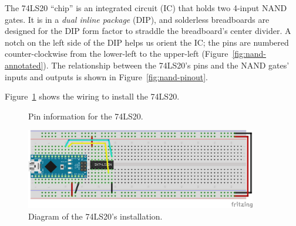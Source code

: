 The 74LS20 ``chip'' is an integrated circuit (IC) that holds two 4-input NAND
gates. It is in a \textit{dual inline package} (DIP), and solderless
breadboards are designed for the DIP form factor to straddle the breadboard's
center divider. A notch on the left side of the DIP helps us orient the IC; the
pins are numbered counter-clockwise from the lower-left to the upper-left
(Figure~\ref{fig:nand-annotated}). The relationship between the 74LS20's pins
and the NAND gates' inputs and outputs is shown in
Figure~\ref{fig:nand-pinout}.

Figure~\ref{fig:nand-diagram} shows the wiring to install the 74LS20.

\begin{figure}
    \centering
    \hfil
    \caption{Pin information for the 74LS20.}
\end{figure}

\begin{figure}
    \centering
    \includegraphics[width=0.9\textwidth]{fritzing_images/nand}
    \caption{Diagram of the 74LS20's installation.
        \label{fig:nand-diagram}}
\end{figure}

